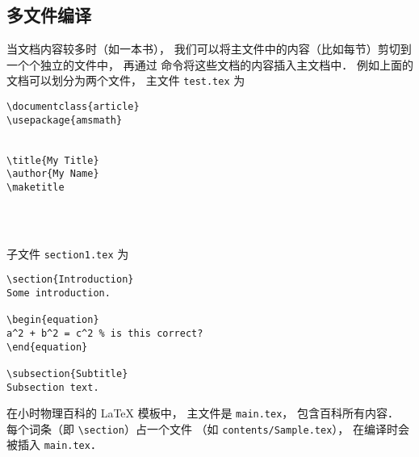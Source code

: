 \subsection{多文件编译}
当文档内容较多时（如一本书）， 我们可以将主文件中的内容（比如每节）剪切到一个个独立的文件中， 再通过 \lstinline|| 命令将这些文档的内容插入主文档中． 例如上面的文档可以划分为两个文件， 主文件 \lstinline|test.tex| 为
\begin{lstlisting}
\documentclass{article}
\usepackage{amsmath}


\title{My Title}
\author{My Name}
\maketitle




\end{lstlisting}

子文件 \lstinline|section1.tex| 为
\begin{lstlisting}
\section{Introduction}
Some introduction.

\begin{equation}
a^2 + b^2 = c^2 % is this correct?
\end{equation}

\subsection{Subtitle}
Subsection text.
\end{lstlisting}

在小时物理百科的 LaTeX 模板中， 主文件是 \lstinline|main.tex|， 包含百科所有内容． 每个词条（即 \lstinline|\section|）占一个文件 （如 \lstinline|contents/Sample.tex|）， 在编译时会被插入 \lstinline|main.tex|．
